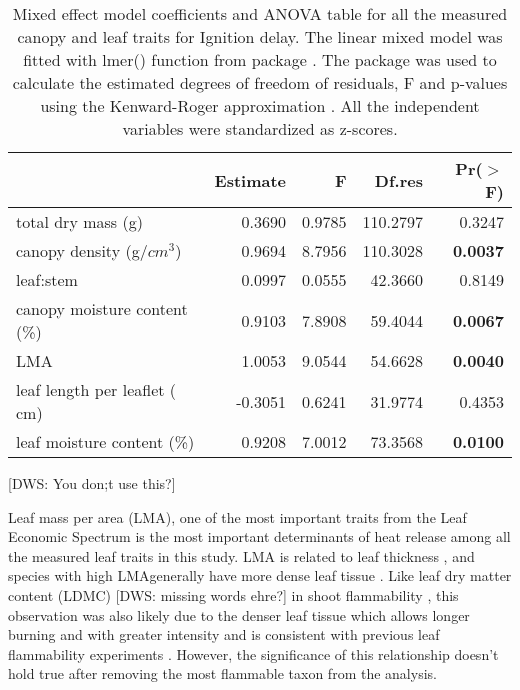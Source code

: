 \documentclass[12pt]{report}
\begin{document}
\begin{table}[ht]
\centering
\caption{Mixed effect model coefficients and ANOVA table for all the measured canopy and leaf traits for Ignition delay. The linear mixed model was fitted with lmer() function from  package \citep{bates2009package}. The  package \citep{fox2013hypothesis} was used to calculate the estimated degrees of freedom of residuals, F and p-values using the Kenward-Roger approximation \citep{kenward1997small}. All the independent variables were standardized  as z-scores.}
\vspace{0.2\,cm}
\begin{tabular}{lrrrr}
  \hline
 & Estimate & F & Df.res & Pr($>$F) \\ 
  \hline 
  total dry mass (g) & 0.3690  & 0.9785  & 110.2797 & 0.3247 \\ 
  canopy density (g/{$cm^3$}) & 0.9694 & 8.7956  & 110.3028 & \textbf{0.0037} \\ 
  leaf:stem & 0.0997 & 0.0555  & 42.3660 & 0.8149 \\ 
  canopy moisture content (\%) & 0.9103 & 7.8908 & 59.4044 & \textbf{0.0067} \\ 
  LMA & 1.0053 & 9.0544  & 54.6628 & \textbf{0.0040} \\ 
  leaf length per leaflet (\,cm) & -0.3051 & 0.6241 & 31.9774 & 0.4353 \\ 
  leaf moisture content (\%) & 0.9208 & 7.0012  & 73.3568 & \textbf{0.0100} \\ 
  \hline
\end{tabular}
\end{table}


[DWS: You don;t use this?]


Leaf mass per area (LMA), one of the most important traits from the Leaf Economic Spectrum \citep{wright2004worldwide} is the most important determinants of heat release among all the measured leaf traits in this study. LMA is related to leaf thickness \citep{niinemets1999research}, and species with high LMAgenerally have more dense leaf tissue \citep{poorter2009causes}. Like leaf dry matter content (LDMC) [DWS: missing words ehre?]  in shoot flammability \citep{alam2020shoot, potts2022growth}, this observation was also likely due to the denser leaf tissue which allows longer burning and with greater intensity and is consistent with previous leaf flammability experiments \citep{krix2018landscape}. However, the significance of this relationship doesn’t hold true after removing the most flammable taxon from the analysis. 
\end{document}
